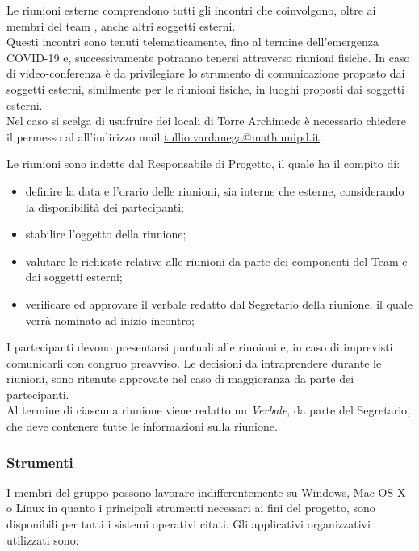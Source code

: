 				Le riunioni esterne comprendono tutti gli incontri che coinvolgono, oltre ai membri del team \Gruppo{}, anche altri soggetti esterni.\\
				Questi incontri sono tenuti telematicamente, fino al termine dell'emergenza COVID-19 e, successivamente potranno tenersi attraverso riunioni fisiche. In caso di video-conferenza è da privilegiare lo strumento di comunicazione proposto dai soggetti esterni, similmente per le riunioni fisiche, in luoghi proposti dai soggetti esterni.\\
				Nel caso si scelga di usufruire dei locali di Torre Archimede è necessario chiedere il permesso al \TV{} all'indirizzo mail \href{mailto:tullio.vardanega@math.unipd.it}{tullio.vardanega@math.unipd.it}.
			
				Le riunioni sono indette dal Responsabile di Progetto, il quale ha il compito di:
				\begin{itemize}
					\item definire la data e l'orario delle riunioni, sia interne che esterne, considerando la disponibilità dei partecipanti;
					\item stabilire l'oggetto della riunione;
					\item valutare le richieste relative alle riunioni da parte dei componenti del Team \Gruppo{} e dai soggetti esterni;
					\item verificare ed approvare il verbale redatto dal Segretario della riunione, il quale verrà nominato ad inizio incontro;
				\end{itemize}
				I partecipanti devono presentarsi puntuali alle riunioni e, in caso di imprevisti comunicarli con congruo preavviso.
				Le decisioni da intraprendere durante le riunioni, sono ritenute approvate nel caso di maggioranza da parte dei partecipanti.\\
				Al termine di ciascuna riunione viene redatto un \textit{Verbale}, da parte del Segretario, che deve contenere tutte le informazioni sulla riunione.
		
		
		\subsubsection{Strumenti}
			I membri del gruppo \Gruppo{} possono lavorare indifferentemente su Windows, Mac OS X o Linux in quanto i principali strumenti necessari ai fini del progetto, sono disponibili per tutti i sistemi operativi citati. Gli applicativi organizzativi utilizzati sono:
			
